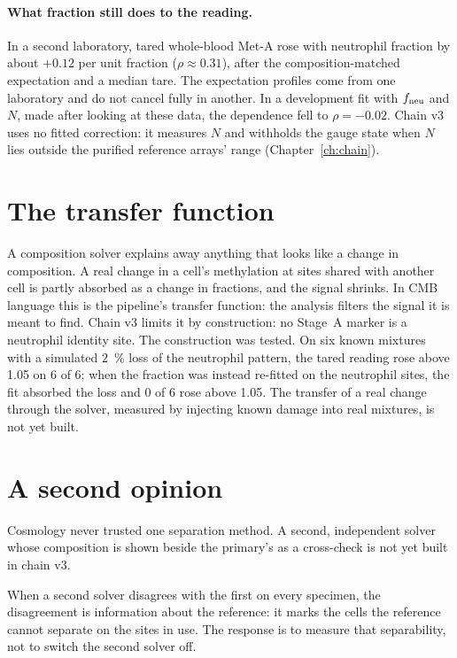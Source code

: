 \paragraph{What fraction still does to the reading.} In a second laboratory, tared whole-blood Met-A rose with neutrophil fraction by about $+0.12$
per unit fraction ($\rho\approx0.31$), after the composition-matched expectation and a median tare. \measured{} The expectation
profiles come from one laboratory and do not cancel fully in another. In a development fit with $f_{\rm neu}$ and $N$, made after looking at these data, the dependence fell to
$\rho=-0.02$. \fitted{} Chain v3 uses no fitted correction: it measures $N$ and withholds the gauge state when $N$
lies outside the purified reference arrays' range (Chapter~\ref{ch:chain}).

\section{The transfer function}

A composition solver explains away anything that looks like a change in composition. A real change in a cell's methylation at sites shared with
another cell is partly absorbed as a change in fractions, and the signal shrinks. In CMB language this is the pipeline's transfer function: the
analysis filters the signal it is meant to find. Chain v3 limits it by construction: no Stage~A marker is a neutrophil identity site. The
construction was tested. On six known mixtures with a simulated 2~\% loss of the neutrophil pattern, the tared reading rose above 1.05 on 6 of 6;
when the fraction was instead re-fitted on the neutrophil sites, the fit absorbed the loss and 0 of 6 rose above 1.05. \measured{} The transfer of a real change through the solver, measured by injecting known damage into
real mixtures, is not yet built. \openprob

\section{A second opinion}

Cosmology never trusted one separation method. A second, independent solver whose composition is shown beside the primary's as a cross-check is
not yet built in chain v3. \openprob

When a second solver disagrees with the first on every specimen, the disagreement is information about the reference: it marks the
cells the reference cannot separate on the sites in use. The response is to measure that separability, not to switch the second
solver off. \interp

